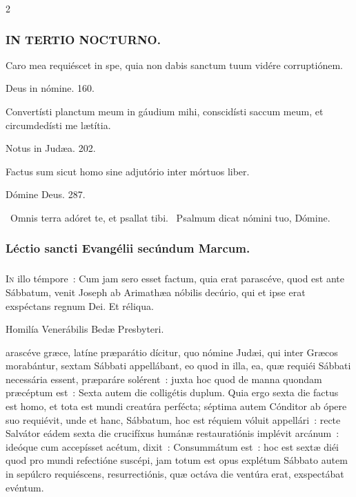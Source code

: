 \documentclass[9pt,twoside]{extarticle}
\begin{document}
\begin{multicols}{2}
\subsubsection*{\center \textsc{IN TERTIO NOCTURNO.}}
\begin{tightlist}{}
\item {} Caro mea requiéscet in spe, quia non dabis sanctum tuum vidére corruptiónem.
\item {} Deus in nómine. 160.
\item {} Convertísti planctum meum in gáudium mihi, conscidísti saccum meum, et circumdedísti me lætítia.
\item {} Notus in Judæa. 202.
\item {} Factus sum sicut homo sine adjutório inter mórtuos liber.
\item {} Dómine Deus. 287.
\item {}~Omnis terra adóret te, et psallat tibi. ~Psalmum dicat nómini tuo, Dómine.
\end{tightlist}

\subsubsection*{\center Léctio sancti Evangélii secúndum Marcum.}
\subsubsection*{\center {}}
\lettrine{I}n illo témpore~: Cum jam sero esset factum, quia erat parascéve, quod est ante Sábbatum, venit Joseph ab Arimathæa nóbilis decúrio, qui et ipse erat exspéctans regnum Dei. Et réliqua.

\begin{center}Homilía Venerábilis Bedæ Presbyteri.\\
\end{center}
arascéve græce, latíne præparátio dícitur, quo nómine Judæi, qui inter Græcos morabántur, sextam Sábbati appellábant, eo quod in illa, ea, quæ requiéi Sábbati necessária essent, præparáre solérent~: juxta hoc quod de manna quondam præcéptum est~: Sexta autem die colligétis duplum. Quia ergo sexta die factus est homo, et tota est mundi creatúra perfécta; séptima autem Cónditor ab ópere suo requiévit, unde et hanc, Sábbatum, hoc est réquiem vóluit appellári~: recte Salvátor eádem sexta die crucifíxus humánæ restauratiónis implévit arcánum~: ideóque cum accepísset acétum, dixit~: Consummátum est~: hoc est sextæ diéi quod pro mundi refectióne suscépi, jam totum est opus explétum Sábbato autem in sepúlcro requiéscens, resurrectiónis, quæ octáva die ventúra erat, exspectábat evéntum.


\end{multicols}
\end{document}
